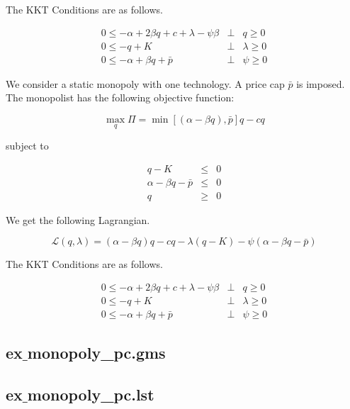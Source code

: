\documentclass[11pt,a4paper]{article}
\begin{document}
The KKT Conditions are as follows.

\begin{eqnarray*}
	0 \leq -\alpha + 2\beta q + c + \lambda - \psi\beta &\bot& q \geq 0\\
	0 \leq -q + K &\bot& \lambda \geq 0\\
        0 \leq - \alpha + \beta q + \bar{p}  &\bot& \psi \geq 0
\end{eqnarray*}

We consider a static monopoly with one technology. A price cap $\bar{p}$ is imposed. The monopolist has the following objective function:

\begin{equation*}
	\max_q\Pi = \min\left[(\alpha-\beta q),\bar{p}\right]q - cq 
\end{equation*}

subject to

\begin{eqnarray*}
	q - K &\leq& 0\\
        \alpha-\beta q - \bar{p} &\leq& 0 \\ 
	q &\geq& 0 
\end{eqnarray*}
 
We get the following Lagrangian.

\begin{equation*}
	\mathcal{L}(q,\lambda)= (\alpha-\beta q)q - cq -\lambda(q-K) - \psi\left(\alpha-\beta q-\bar{p}\right)
\end{equation*}

The KKT Conditions are as follows.

\begin{eqnarray*}
	0 \leq -\alpha + 2\beta q + c + \lambda - \psi\beta &\bot& q \geq 0\\
	0 \leq -q + K &\bot& \lambda \geq 0\\
        0 \leq - \alpha + \beta q + \bar{p}  &\bot& \psi \geq 0
\end{eqnarray*}

\subsection*{ex$\_$monopoly\_pc.gms}


\subsection*{ex$\_$monopoly\_pc.lst}

\end{document}
